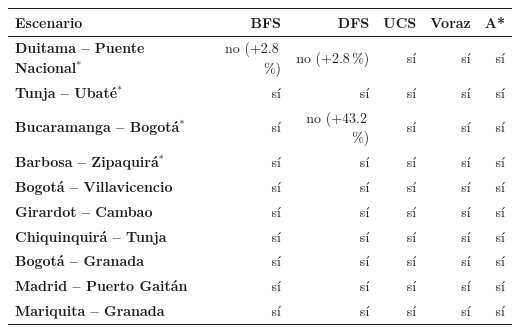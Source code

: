 \renewcommand{\arraystretch}{1.2}
\begin{tabular}{|l|r|r|r|r|r|}
\hline
\rowcolor{gray!20} \textbf{Escenario} & \textbf{BFS} & \textbf{DFS} & \textbf{UCS} & \textbf{Voraz} & \textbf{A*} \\
\hline
\textbf{Duitama -- Puente Nacional$^{*}$} & no (+2.8\,\%) & no (+2.8\,\%) & sí & sí & sí \\
\hline
\textbf{Tunja -- Ubaté$^{*}$} & sí & sí & sí & sí & sí \\
\hline
\textbf{Bucaramanga -- Bogotá$^{*}$} & sí & no (+43.2\,\%) & sí & sí & sí \\
\hline
\textbf{Barbosa -- Zipaquirá$^{*}$} & sí & sí & sí & sí & sí \\
\hline
\textbf{Bogotá -- Villavicencio} & sí & sí & sí & sí & sí \\
\hline
\textbf{Girardot -- Cambao} & sí & sí & sí & sí & sí \\
\hline
\textbf{Chiquinquirá -- Tunja} & sí & sí & sí & sí & sí \\
\hline
\textbf{Bogotá -- Granada} & sí & sí & sí & sí & sí \\
\hline
\textbf{Madrid -- Puerto Gaitán} & sí & sí & sí & sí & sí \\
\hline
\textbf{Mariquita -- Granada} & sí & sí & sí & sí & sí \\
\hline
\end{tabular}

